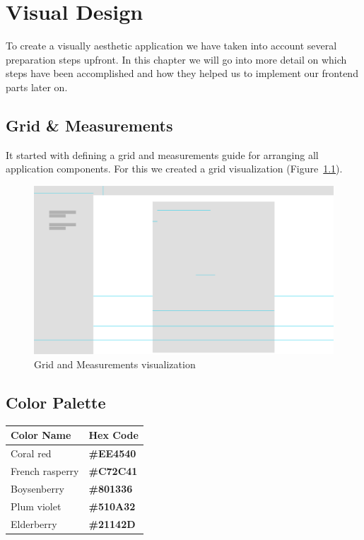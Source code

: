 \chapter{Visual Design}

To create a visually aesthetic application we have taken into account several preparation steps upfront. In this chapter
we will go into more detail on which steps have been accomplished and how they helped us to implement our frontend parts
later on.

\section{Grid \& Measurements}\label{sec:grid-and-measurements}

It started with defining a grid and measurements guide for arranging all application components. For this we created a
grid visualization (Figure~\ref{fig:grid}).

\begin{figure}[!ht]
    \centering
    \includegraphics[width=1.0\textwidth]{./images/grid.pdf}
    \caption{Grid and Measurements visualization}
    \label{fig:grid}
\end{figure}

\section{Color Palette}\label{sec:color-palette}

\begin{table}
    \centering
    \begin{tabular}{|l|l|}
        \hline
        Color Name & Hex Code \\ \hline
        Coral red & \color[HTML]{EE4540}\textbf{\#EE4540} \\ \hline
        French rasperry & \color[HTML]{C72C41}\textbf{\#C72C41} \\ \hline
        Boysenberry & \color[HTML]{801336}\textbf{\#801336} \\ \hline
        Plum violet & \color[HTML]{510A32}\textbf{\#510A32} \\ \hline
        Elderberry & \color[HTML]{21142D}\textbf{\#21142D} \\ \hline
    \end{tabular}\label{tab:colorTable}
\end{table}

